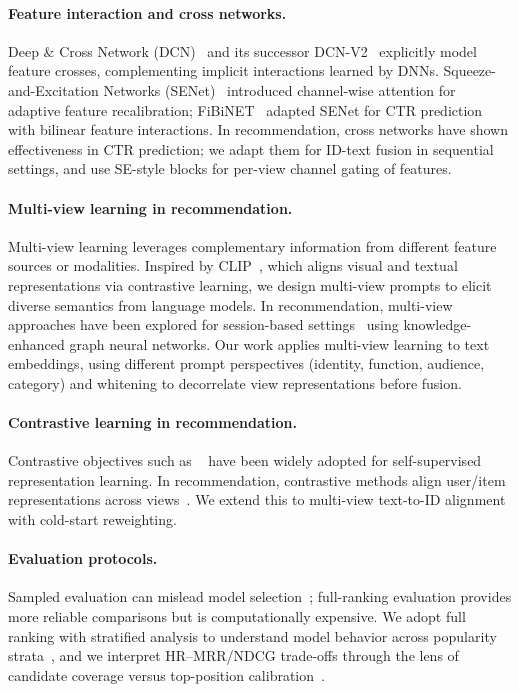 \paragraph{Feature interaction and cross networks.}
Deep \& Cross Network (DCN)~\cite{wang2017dcn} and its
successor DCN-V2~\cite{wang2021dcnv2} explicitly model feature
crosses, complementing implicit interactions learned by DNNs.
Squeeze-and-Excitation Networks (SENet)~\cite{hu2018senet}
introduced channel-wise attention for adaptive feature
recalibration; FiBiNET~\cite{huang2019fibinet} adapted SENet
for CTR prediction with bilinear feature interactions. In
recommendation, cross networks have shown effectiveness in CTR
prediction; we adapt them for ID-text fusion in sequential
settings, and use SE-style blocks for per-view channel gating of \llm
features.

\paragraph{Multi-view learning in recommendation.}
Multi-view learning leverages complementary information from
different feature sources or modalities. Inspired by
CLIP~\cite{radford2021clip}, which aligns visual and textual
representations via contrastive learning, we design multi-view
prompts to elicit diverse semantics from language models. In
recommendation, multi-view approaches have been explored for
session-based settings~\cite{chen2023kmvg} using
knowledge-enhanced graph neural networks. Our work applies
multi-view learning to \llm text embeddings, using different
prompt perspectives (identity, function, audience, category)
and whitening to decorrelate view representations before
fusion.

\paragraph{Contrastive learning in recommendation.}
Contrastive objectives such as \InfoNCE~\cite{oord2018cpc}
have been widely adopted for self-supervised representation
learning. In recommendation, contrastive methods align
user/item representations across views~\cite{wu2021cl4rec}.
We extend this to multi-view text-to-ID alignment with
cold-start reweighting.

\paragraph{Evaluation protocols.}
Sampled evaluation can mislead model
selection~\cite{krichene2020sampledmetrics}; full-ranking
evaluation provides more reliable comparisons but is
computationally expensive. We adopt full ranking with
stratified analysis to understand model behavior across
popularity strata~\cite{abdollahpouri2019unfairness}, and we
interpret HR--MRR/NDCG trade-offs through the lens of
candidate coverage versus top-position calibration~\cite{steck2018calibrated}.
